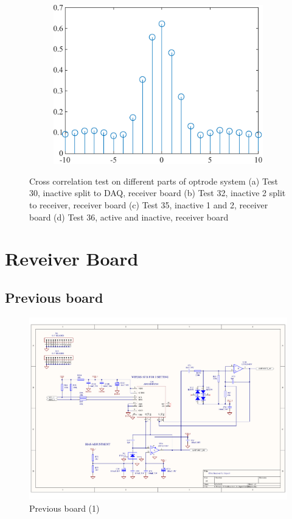 \begin{figure}
\begin{subfigure}{.5\textwidth}
  \caption{}
  \label{fig_CrossCorrelation35}
\end{subfigure}%
\begin{subfigure}{.5\textwidth}
  \centering
  \includegraphics[width=0.8\linewidth]{4-ANC_Sys/CrossCorrelation 36.pdf}
  \caption{}
  \label{fig_CrossCorrelation36}
\end{subfigure}
\caption{Cross correlation test on different parts of optrode system (a) Test 30, inactive split to DAQ, receiver board (b) Test 32, inactive 2 split to receiver, receiver board (c) Test 35, inactive 1 and 2, receiver board (d) Test 36, active and inactive, receiver board}
\label{fig_CrossCorrelationTest}
\end{figure}



\section{Reveiver Board}

\subsection{Previous board}

\begin{figure}[!ht]
\centering
\includegraphics[width=0.9\linewidth]{4-ANC_Sys/FibreReceiver_3c_Input1.pdf}
\caption{Previous board (1)}
\label{fig_DavidBoardIn}
\end{figure}

